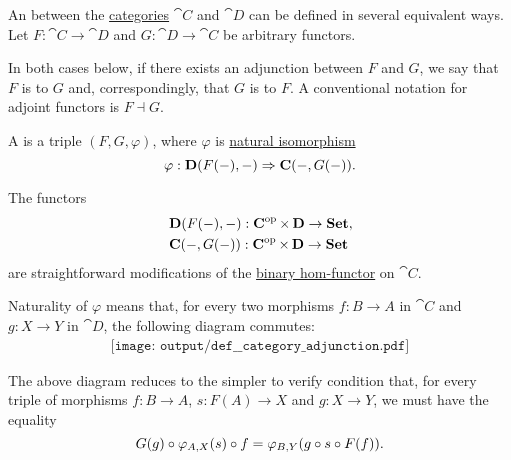 \begin{definition}\label{def:category_adjunction}
  An  between the \hyperref[def:category]{categories} \( \cat{C} \) and \( \cat{D} \) can be defined in several equivalent ways. Let \( F: \cat{C} \to \cat{D} \) and \( G: \cat{D} \to \cat{C} \) be arbitrary functors.

  In both cases below, if there exists an adjunction between \( F \) and \( G \), we say that \( F \) is  to \( G \) and, correspondingly, that \( G \) is  to \( F \). A conventional notation for adjoint functors is \( F \dashv G \).

  \begin{thmenum}
     A  is a triple \( (F, G, \varphi) \), where \( \varphi \) is \hyperref[thm:natural_isomorphism]{natural isomorphism}
    \begin{equation}\label{eq:def:category_adjunction/hom}
      \varphi: \cat{D}(F(\anon*), \anon*) \Rightarrow \cat{C}(\anon*, G(\anon*)).
    \end{equation}

    The functors
    \begin{align*}
      &\cat{D}(F(\anon*), \anon*): \cat{C}^{\opcat} \times \cat{D} \to \cat{Set}, \\
      &\cat{C}(\anon*, G(\anon*)): \cat{C}^{\opcat} \times \cat{D} \to \cat{Set}
    \end{align*}
    are straightforward modifications of the \hyperref[eq:def:hom_functor/binary]{binary hom-functor} on \( \cat{C} \).

    Naturality of \( \varphi \) means that, for every two morphisms \( f: B \to A \) in \( \cat{C} \) and \( g: X \to Y \) in \( \cat{D} \), the following diagram commutes:
    \begin{equation}\label{eq:def:category_adjunction/varphi_nat_diagram}
      \begin{aligned}
        \texttt{[image: output/def\_\_category\_adjunction.pdf]}
      \end{aligned}
    \end{equation}

    The above diagram reduces to the simpler to verify condition that, for every triple of morphisms \( f: B \to A \), \( s: F(A) \to X \) and \( g: X \to Y \), we must have the equality
    \begin{equation}\label{eq:def:category_adjunction/varphi_nat}
      G(g) \bincirc \varphi_{A,X}(s) \bincirc f = \varphi_{B,Y}(g \bincirc s \bincirc F(f)).
    \end{equation}


\end{thmenum}
\end{definition}
